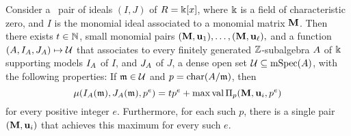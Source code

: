 \documentclass{amsart}
\begin{document}
\begin{theorem}
   \label{invariants associated to a monomial ideal in large characteristic: T}   
   Consider a \compatible\ pair of ideals $(I,J)$ of $R=\Bbbk[x]$, where $\Bbbk$ is a field of characteristic zero, and $I$ is the monomial ideal associated to a monomial matrix $\mathbf{M}$.  Then there exists $t \in \mathbb{N}$, small monomial pairs $(\mathbf{M}, \mathbf{u}_1),  \ldots, (\mathbf{M}, \mathbf{u}_{\ell}),$ and a function $(A, I_A, J_A) \mapsto \mathcal{U}$  that associates to every finitely generated $\mathbb{Z}$-subalgebra $A$ of $\Bbbk$ supporting models $I_A$ of $I$, and $J_A$ of $J$, a dense open set $\mathcal{U} \subseteq \operatorname{mSpec}(A)$, with the following properties\textup:
   If $\mathfrak{m} \in \mathcal{U}$ and $p = \operatorname{char}(A/\mathfrak{m})$, then 
   \[
      \mu(I_A(\mathfrak{m}), J_A(\mathfrak{m}), p^e) = tp^e + \max \operatorname{val} \Pi_p(\mathbf{M}, \mathbf{u}_i, p^e) 
   \]
   for every positive integer $e$.
Furthermore, for each such $p$, there is a single pair $(\mathbf{M}, \mathbf{u}_i)$ that achieves this maximum for every such $e$.  
\end{theorem}
\end{document}
